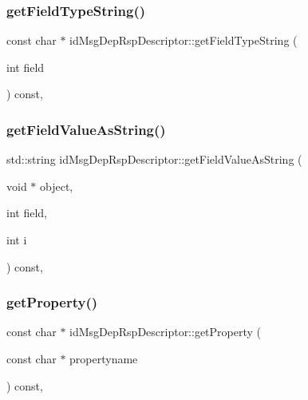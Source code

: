 \subsubsection{\texorpdfstring{get\+Field\+Type\+String()}{getFieldTypeString()}}
{\footnotesize\ttfamily const char $\ast$ id\+Msg\+Dep\+Rsp\+Descriptor\+::get\+Field\+Type\+String (\begin{DoxyParamCaption}\item[{int}]{field }\end{DoxyParamCaption}) const\hspace{0.3cm}{\ttfamily [override]}, {\ttfamily [virtual]}}

\mbox{\label{classid_msg_dep_rsp_descriptor_af28908b0998ae5028ce4439705a56bea}} 
\subsubsection{\texorpdfstring{get\+Field\+Value\+As\+String()}{getFieldValueAsString()}}
{\footnotesize\ttfamily std\+::string id\+Msg\+Dep\+Rsp\+Descriptor\+::get\+Field\+Value\+As\+String (\begin{DoxyParamCaption}\item[{void $\ast$}]{object,  }\item[{int}]{field,  }\item[{int}]{i }\end{DoxyParamCaption}) const\hspace{0.3cm}{\ttfamily [override]}, {\ttfamily [virtual]}}

\mbox{\label{classid_msg_dep_rsp_descriptor_a241bcfafb380d863d82e281b53c569d5}} 
\subsubsection{\texorpdfstring{get\+Property()}{getProperty()}}
{\footnotesize\ttfamily const char $\ast$ id\+Msg\+Dep\+Rsp\+Descriptor\+::get\+Property (\begin{DoxyParamCaption}\item[{const char $\ast$}]{propertyname }\end{DoxyParamCaption}) const\hspace{0.3cm}{\ttfamily [override]}, {\ttfamily [virtual]}}

